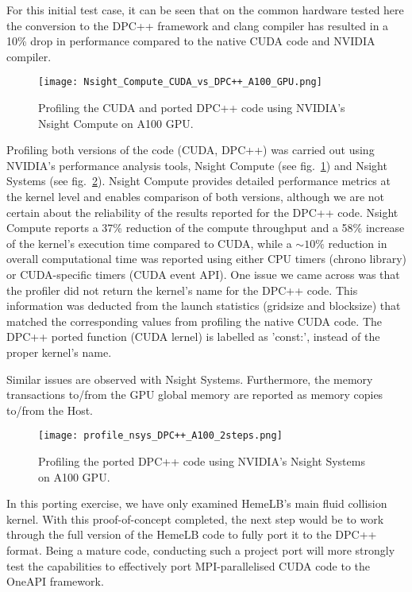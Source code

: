 For this initial test case, it can be seen that on the common hardware tested here the conversion to the DPC++ framework and clang compiler has resulted in a 10\% drop in performance compared to the native CUDA code and NVIDIA compiler.

\begin{figure}[htp]
	\centering
	\texttt{[image: Nsight\_Compute\_CUDA\_vs\_DPC++\_A100\_GPU.png]}
	\caption{Profiling the CUDA and ported DPC++ code using NVIDIA's Nsight Compute on A100 GPU.}
	\label{fig:ncu_CUDA_Vs_DPC++_A100GPU}
\end{figure}

Profiling both versions of the code (CUDA, DPC++) was carried out using NVIDIA's performance analysis tools, Nsight Compute (see fig.~\ref{fig:ncu_CUDA_Vs_DPC++_A100GPU}) and Nsight Systems (see fig.~\ref{fig:nsys_DPC++_A100GPU}). Nsight Compute provides detailed performance metrics at the kernel level and enables comparison of both versions, although we are not certain about the reliability of the results reported for the DPC++ code. Nsight Compute reports a 37\% reduction of the compute throughput and a 58\% increase of the kernel's execution time compared to CUDA, while a $\sim10\%$ reduction in overall computational time was reported using either CPU timers (chrono library) or CUDA-specific timers (CUDA event API).
One issue we came across was that the profiler did not return the kernel's name for the DPC++ code. This information was deducted from the launch statistics (gridsize and blocksize) that matched the corresponding values from profiling the native CUDA code. The DPC++ ported function (CUDA lernel) is labelled as 'const:', instead of the proper kernel's name.


Similar issues are observed with Nsight Systems. Furthermore, the memory transactions to/from the GPU global memory are reported as memory copies to/from the Host.


\begin{figure}[htp]
	\centering
	\texttt{[image: profile\_nsys\_DPC++\_A100\_2steps.png]}
	\caption{Profiling the ported DPC++ code using NVIDIA's Nsight Systems on A100 GPU.}
	\label{fig:nsys_DPC++_A100GPU}
\end{figure}

In this porting exercise, we have only examined HemeLB's main fluid collision kernel. With this proof-of-concept completed, the next step would be to work through the full version of the HemeLB code to fully port it to the DPC++ format. Being a mature code, conducting such a project port will more strongly test the capabilities to effectively port MPI-parallelised CUDA code to the OneAPI framework.


